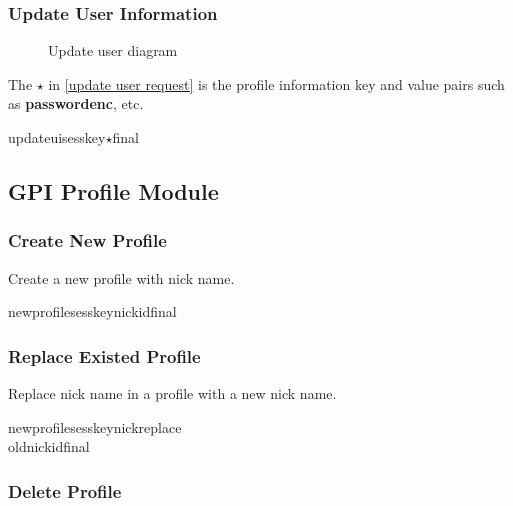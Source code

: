 \documentclass[oneside,titlepage,a4paper]{Definition/retrospy} %
\begin{document}
\subsubsection{Update User Information}
\begin{figure}[H]
	\centering
	\caption{Update user diagram}
	\label{Update user diagram}
\end{figure}
\ClientRequest
The $\star$ in \ref{update user request} is the profile information key and value pairs such as \textbf{\tbs passwordenc\tbs}, etc.
\begin{mybox}[label = update user request]
	\tbs updateui\tbs\tbs sesskey\tbs<session key>\tbs $\star$\tbs final\tbs
\end{mybox}



\subsection{GPI Profile Module}

\subsubsection{Create New Profile}
Create a new profile with nick name.
\ClientRequest

\begin{mybox}
	\tbs newprofile\tbs\tbs sesskey\tbs <session key>\tbs nick\tbs <nick name>\tbs id\tbs<operation id>\tbs final\tbs
\end{mybox}
\subsubsection{Replace Existed Profile}
Replace nick name in a profile with a new nick name.
\ClientRequest

\begin{mybox}
\tbs newprofile\tbs\tbs sesskey\tbs nick\tbs replace\\\tbs oldnick\tbs id\tbs final\tbs
\end{mybox}

\subsubsection{Delete Profile}
\ClientRequest
\end{document}
